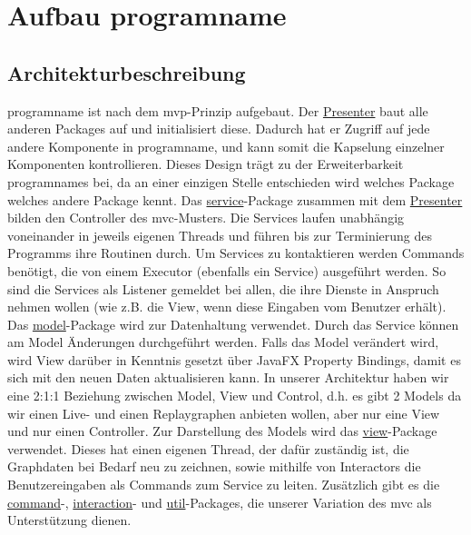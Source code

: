 \chapter{Aufbau \gls{programname}}
\label{ch:aufbau_programname}

\section{Architekturbeschreibung}

\gls{programname} ist nach dem \gls{mvp}-Prinzip aufgebaut. Der
\hyperref[subsec:presenter]{Presenter} baut alle anderen Packages auf und
initialisiert diese. Dadurch hat er Zugriff auf jede andere Komponente in \gls{programname},
und kann somit die Kapselung einzelner Komponenten kontrollieren. Dieses Design
trägt zu der Erweiterbarkeit \gls{programname}s bei, da an einer einzigen
Stelle entschieden wird welches Package welches andere Package kennt.
\newline
\newline
Das \hyperref[subsec:service]{service}-Package zusammen mit dem \hyperref[subsec:presenter]{Presenter}
bilden den Controller des \gls{mvc}-Musters. Die Services laufen unabhängig voneinander in
jeweils eigenen Threads und führen bis zur Terminierung des Programms ihre Routinen durch.
Um Services zu kontaktieren werden Commands benötigt, die von einem Executor (ebenfalls ein
Service) ausgeführt werden. So sind die Services als Listener gemeldet bei allen, die ihre
Dienste in Anspruch nehmen wollen (wie z.B. die View, wenn diese Eingaben vom Benutzer erhält).
\newline
\newline
Das \hyperref[subsec:model]{model}-Package wird zur Datenhaltung verwendet. Durch das Service
können am Model Änderungen durchgeführt werden. Falls das Model verändert wird, wird View
darüber in Kenntnis gesetzt über JavaFX Property Bindings, damit es sich mit den neuen Daten
aktualisieren kann. In unserer Architektur haben wir eine 2:1:1 Beziehung zwischen Model,
View und Control, d.h. es gibt 2 Models da wir einen Live- und einen Replaygraphen anbieten wollen,
aber nur eine View und nur einen Controller.
\newline
\newline
Zur Darstellung des Models wird das \hyperref[subsec:view]{view}-Package verwendet. Dieses
hat einen eigenen Thread, der dafür zuständig ist, die Graphdaten bei Bedarf neu zu zeichnen,
sowie mithilfe von Interactors die Benutzereingaben als Commands zum Service zu leiten.
\newline
\newline
Zusätzlich gibt es die \hyperref[subsec:command]{command}-, \hyperref[subsec:interaction]{interaction}-
und \hyperref[subsec:util]{util}-Packages, die unserer Variation des \gls{mvc} als Unterstützung dienen.


